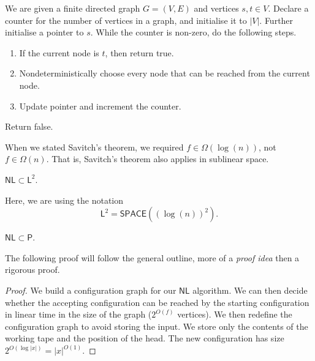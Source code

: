 \begin{algorithm}
	We are given a finite directed graph $G = (V,E)$ and
	vertices $s,t \in V$.
	Declare a counter for the number of vertices in a graph,
	and initialise it to $\left\lvert V \right\rvert$.
	Further initialise a pointer to $s$.
	While the counter is non-zero, do the following steps.
	\begin{enumerate}
		\item
		If the current node is $t$, then return true.

		\item
		Nondeterministically choose every node that can be reached from the
		current node.

		\item 
		Update pointer and increment the counter.
	\end{enumerate}
	Return false.
\end{algorithm}

When we stated Savitch's theorem, we required $f \in \Omega(\log(n))$, not
$f \in \Omega(n)$.
That is, Savitch's theorem also applies in sublinear space.

\begin{corollary}[]
	$\mathsf{NL} \subset \mathsf L^2$.
\end{corollary}

Here, we are using the notation
\[
	\mathsf L^2 = \mathsf{SPACE}\left( 
		\left( 
			\log(n) 
		\right)^2
	\right).
\]

\begin{theorem}[]
	$\mathsf{NL} \subset \mathsf P$.
\end{theorem}

The following proof will follow the general outline,
more of a \emph{proof idea} then a rigorous proof.

\begin{proof}
	We build a configuration graph for our
	$\mathsf{NL}$ algorithm.
	We can then decide whether the accepting configuration
	can be reached by the starting configuration in linear time
	in the size of the graph ($2^{O(f)}$ vertices).
	We then redefine the configuration graph to avoid storing the input.
	We store only the contents of the working tape and the position of the head.
	The new configuration has size
	$2^{O(\log\left\lvert x \right\rvert)} = \left\lvert x \right\rvert^{O(1)}$.
\end{proof}
